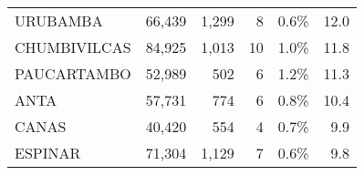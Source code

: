 \begin{tabular}{lrrrrr}
	\cellcolor[HTML]{FFFFC7}URUBAMBA      & 66,439                                                         & 1,299                                                                           & 8                                                              & 0.6\%                                                                  & 12.0                                                                                                                               \\
	\cellcolor[HTML]{FFFFC7}CHUMBIVILCAS  & 84,925                                                         & 1,013                                                                           & 10                                                             & 1.0\%                                                                  & 11.8                                                                                                                               \\
	\cellcolor[HTML]{FFFFC7}PAUCARTAMBO   & 52,989                                                         & 502                                                                             & 6                                                              & 1.2\%                                                                  & 11.3                                                                                                                               \\
	\cellcolor[HTML]{FFFFC7}ANTA          & 57,731                                                         & 774                                                                             & 6                                                              & 0.8\%                                                                  & 10.4                                                                                                                               \\
	\cellcolor[HTML]{FFFFC7}CANAS         & 40,420                                                         & 554                                                                             & 4                                                              & 0.7\%                                                                  & 9.9                                                                                                                                \\
	\cellcolor[HTML]{FFFFC7}ESPINAR       & 71,304                                                         & 1,129                                                                           & 7                                                              & 0.6\%                                                                  & 9.8                                                                                                                                \\

\end{tabular}
